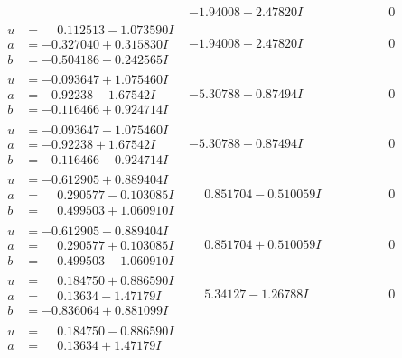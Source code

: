 \documentclass[1p]{elsarticle_modified}
\theoremstyle{definition}
\begin{document}
$$\begin{array}{c|c|c}
 & -1.94008 + 2.47820 I & \phantom{-0.000000 } 0 \\ \hline\begin{aligned}
u &= \phantom{-}0.112513 - 1.073590 I \\
a &= -0.327040 + 0.315830 I \\
b &= -0.504186 - 0.242565 I\end{aligned}
 & -1.94008 - 2.47820 I & \phantom{-0.000000 } 0 \\ \hline\begin{aligned}
u &= -0.093647 + 1.075460 I \\
a &= -0.92238 - 1.67542 I \\
b &= -0.116466 + 0.924714 I\end{aligned}
 & -5.30788 + 0.87494 I & \phantom{-0.000000 } 0 \\ \hline\begin{aligned}
u &= -0.093647 - 1.075460 I \\
a &= -0.92238 + 1.67542 I \\
b &= -0.116466 - 0.924714 I\end{aligned}
 & -5.30788 - 0.87494 I & \phantom{-0.000000 } 0 \\ \hline\begin{aligned}
u &= -0.612905 + 0.889404 I \\
a &= \phantom{-}0.290577 - 0.103085 I \\
b &= \phantom{-}0.499503 + 1.060910 I\end{aligned}
 & \phantom{-}0.851704 - 0.510059 I & \phantom{-0.000000 } 0 \\ \hline\begin{aligned}
u &= -0.612905 - 0.889404 I \\
a &= \phantom{-}0.290577 + 0.103085 I \\
b &= \phantom{-}0.499503 - 1.060910 I\end{aligned}
 & \phantom{-}0.851704 + 0.510059 I & \phantom{-0.000000 } 0 \\ \hline\begin{aligned}
u &= \phantom{-}0.184750 + 0.886590 I \\
a &= \phantom{-}0.13634 - 1.47179 I \\
b &= -0.836064 + 0.881099 I\end{aligned}
 & \phantom{-}5.34127 - 1.26788 I & \phantom{-0.000000 } 0 \\ \hline\begin{aligned}
u &= \phantom{-}0.184750 - 0.886590 I \\
a &= \phantom{-}0.13634 + 1.47179 I \\

\end{aligned}
\end{array}$$
\end{document}
